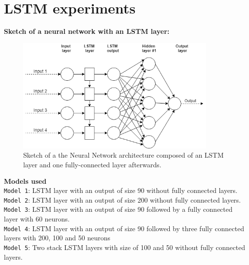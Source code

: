 \chapter{LSTM experiments}
\label{annex:lstm-experiments}


\textbf{Sketch of a neural network with an LSTM layer:}
\begin{figure}[h]
    \centering
    \includegraphics[width=10cm]{images/nn-sketch-lstm.png}
    \caption[Sketch of a Neural Network with LSTM layer]{Sketch of a the Neural Network architecture composed of an LSTM layer and one fully-connected layer afterwards.}
    \label{fig-annex:nn-sketch-lstm}
\end{figure}

\noindent\textbf{Models used}\\
\texttt{Model 1}: LSTM layer with an output of size 90 without  fully connected layers. \\
\texttt{Model 2}: LSTM layer with an output of size 200 without fully connected layers. \\
\texttt{Model 3}: LSTM layer with an output of size 90 followed by a fully connected layer with 60 neurons. \\
\texttt{Model 4}: LSTM layer with an output of size 90 followed by three fully connected layers with 200, 100 and 50 neurons \\
\texttt{Model 5}: Two stack LSTM layers with size of 100 and 50 without fully connected layers. \\


